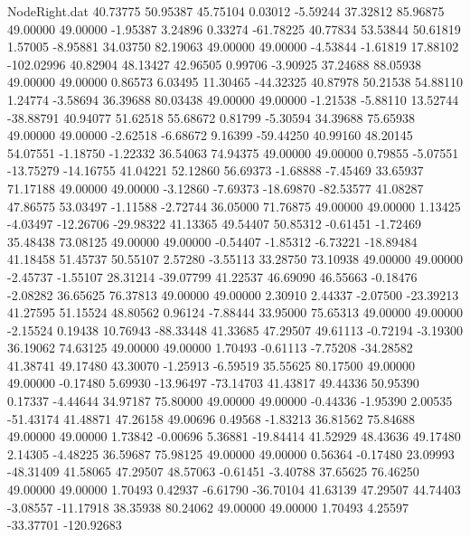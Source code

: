 \begin{filecontents}{NodeRight.dat}
  40.73775   50.95387   45.75104     0.03012   -5.59244   37.32812   85.96875   49.00000   49.00000   -1.95387    3.24896    0.33274  -61.78225
  40.77834   53.53844   50.61819     1.57005   -8.95881   34.03750   82.19063   49.00000   49.00000   -4.53844   -1.61819   17.88102 -102.02996
  40.82904   48.13427   42.96505     0.99706   -3.90925   37.24688   88.05938   49.00000   49.00000    0.86573    6.03495   11.30465  -44.32325
  40.87978   50.21538   54.88110     1.24774   -3.58694   36.39688   80.03438   49.00000   49.00000   -1.21538   -5.88110   13.52744  -38.88791
  40.94077   51.62518   55.68672     0.81799   -5.30594   34.39688   75.65938   49.00000   49.00000   -2.62518   -6.68672    9.16399  -59.44250
  40.99160   48.20145   54.07551    -1.18750   -1.22332   36.54063   74.94375   49.00000   49.00000    0.79855   -5.07551  -13.75279  -14.16755
  41.04221   52.12860   56.69373    -1.68888   -7.45469   33.65937   71.17188   49.00000   49.00000   -3.12860   -7.69373  -18.69870  -82.53577
  41.08287   47.86575   53.03497    -1.11588   -2.72744   36.05000   71.76875   49.00000   49.00000    1.13425   -4.03497  -12.26706  -29.98322
  41.13365   49.54407   50.85312    -0.61451   -1.72469   35.48438   73.08125   49.00000   49.00000   -0.54407   -1.85312   -6.73221  -18.89484
  41.18458   51.45737   50.55107     2.57280   -3.55113   33.28750   73.10938   49.00000   49.00000   -2.45737   -1.55107   28.31214  -39.07799
  41.22537   46.69090   46.55663    -0.18476   -2.08282   36.65625   76.37813   49.00000   49.00000    2.30910    2.44337   -2.07500  -23.39213
  41.27595   51.15524   48.80562     0.96124   -7.88444   33.95000   75.65313   49.00000   49.00000   -2.15524    0.19438   10.76943  -88.33448
  41.33685   47.29507   49.61113    -0.72194   -3.19300   36.19062   74.63125   49.00000   49.00000    1.70493   -0.61113   -7.75208  -34.28582
  41.38741   49.17480   43.30070    -1.25913   -6.59519   35.55625   80.17500   49.00000   49.00000   -0.17480    5.69930  -13.96497  -73.14703
  41.43817   49.44336   50.95390     0.17337   -4.44644   34.97187   75.80000   49.00000   49.00000   -0.44336   -1.95390    2.00535  -51.43174
  41.48871   47.26158   49.00696     0.49568   -1.83213   36.81562   75.84688   49.00000   49.00000    1.73842   -0.00696    5.36881  -19.84414
  41.52929   48.43636   49.17480     2.14305   -4.48225   36.59687   75.98125   49.00000   49.00000    0.56364   -0.17480   23.09993  -48.31409
  41.58065   47.29507   48.57063    -0.61451   -3.40788   37.65625   76.46250   49.00000   49.00000    1.70493    0.42937   -6.61790  -36.70104
  41.63139   47.29507   44.74403    -3.08557  -11.17918   38.35938   80.24062   49.00000   49.00000    1.70493    4.25597  -33.37701 -120.92683

\end{filecontents}

